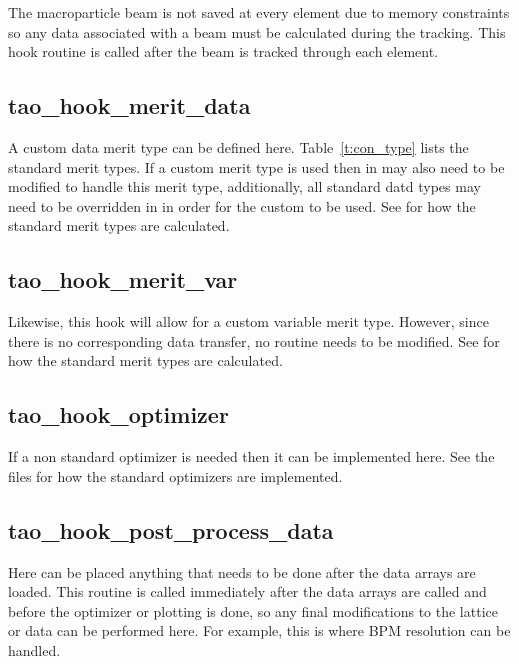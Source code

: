 The macroparticle beam is not saved at every element due to memory constraints
so any data associated with a beam must be calculated during the tracking. This
hook routine is called after the beam is tracked through each element.

\subsection{tao\_hook\_merit\_data}

A custom data merit type can be defined here. Table~\ref{t:con_type} lists the
standard merit types. If a custom merit type is used then  in
 may also need to be modified to handle this merit
type, additionally, all standard datd types may need to be overridden in 
 in order for the custom  to be used.
See  for how the standard merit types are calculated.

\subsection{tao\_hook\_merit\_var}

Likewise, this hook will allow for a custom variable merit type. However, since
there is no corresponding data transfer, no  routine needs to be modified.
See  for how the standard merit types are calculated.

\subsection{tao\_hook\_optimizer}

If a non standard optimizer is needed then it can be implemented here. See the
 files for how the standard optimizers are
implemented.

\subsection{tao\_hook\_post\_process\_data}

Here can be placed anything that needs to be done after the data arrays are
loaded. This routine is called immediately after the data arrays are called and
before the optimizer or plotting is done, so any final modifications to the
lattice or data can be performed here. For example, this is where BPM
resolution can be handled.

